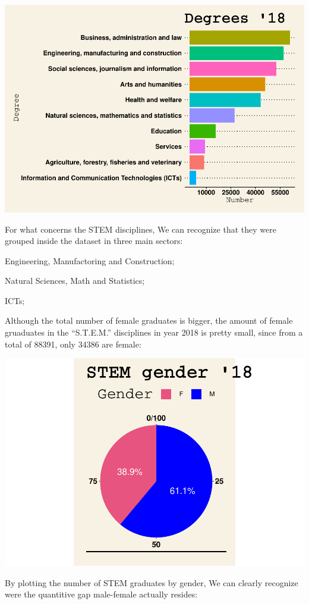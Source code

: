\documentclass[
]{article}
\begin{document}
\includegraphics{g_gap_stem_files/figure-latex/unnamed-chunk-4-1.pdf}

For what concerns the STEM disciplines, We can recognize that they were
grouped inside the dataset in three main sectors:

Engineering, Manufactoring and Construction;

Natural Sciences, Math and Statistics;

ICTs;

Although the total number of female graduates is bigger, the amount of
female gruaduates in the ``S.T.E.M.'' disciplines in year 2018 is pretty
small, since from a total of 88391, only 34386 are female:

\includegraphics{g_gap_stem_files/figure-latex/unnamed-chunk-5-1.pdf}

By plotting the number of STEM graduates by gender, We can clearly
recognize were the quantitive gap male-female actually resides:
\end{document}
